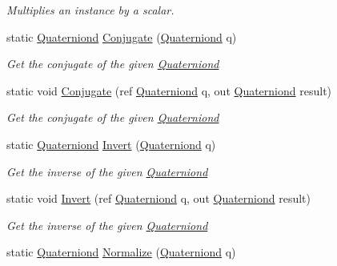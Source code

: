 \begin{DoxyCompactItemize}
\begin{DoxyCompactList}\small\item\em Multiplies an instance by a scalar. \end{DoxyCompactList}\item 
static \hyperlink{struct_open_t_k_1_1_quaterniond}{Quaterniond} \hyperlink{struct_open_t_k_1_1_quaterniond_a6e31ad4548580e67fd112673b047563e}{Conjugate} (\hyperlink{struct_open_t_k_1_1_quaterniond}{Quaterniond} q)
\begin{DoxyCompactList}\small\item\em Get the conjugate of the given \hyperlink{struct_open_t_k_1_1_quaterniond}{Quaterniond} \end{DoxyCompactList}\item 
static void \hyperlink{struct_open_t_k_1_1_quaterniond_a1dec147f14cb1847374fb87e6718e193}{Conjugate} (ref \hyperlink{struct_open_t_k_1_1_quaterniond}{Quaterniond} q, out \hyperlink{struct_open_t_k_1_1_quaterniond}{Quaterniond} result)
\begin{DoxyCompactList}\small\item\em Get the conjugate of the given \hyperlink{struct_open_t_k_1_1_quaterniond}{Quaterniond} \end{DoxyCompactList}\item 
static \hyperlink{struct_open_t_k_1_1_quaterniond}{Quaterniond} \hyperlink{struct_open_t_k_1_1_quaterniond_a2e0b1d66188a58a10dd71676b51d2743}{Invert} (\hyperlink{struct_open_t_k_1_1_quaterniond}{Quaterniond} q)
\begin{DoxyCompactList}\small\item\em Get the inverse of the given \hyperlink{struct_open_t_k_1_1_quaterniond}{Quaterniond} \end{DoxyCompactList}\item 
static void \hyperlink{struct_open_t_k_1_1_quaterniond_a9b96050970ec65cd8120565bdcf956f9}{Invert} (ref \hyperlink{struct_open_t_k_1_1_quaterniond}{Quaterniond} q, out \hyperlink{struct_open_t_k_1_1_quaterniond}{Quaterniond} result)
\begin{DoxyCompactList}\small\item\em Get the inverse of the given \hyperlink{struct_open_t_k_1_1_quaterniond}{Quaterniond} \end{DoxyCompactList}\item 
static \hyperlink{struct_open_t_k_1_1_quaterniond}{Quaterniond} \hyperlink{struct_open_t_k_1_1_quaterniond_aba1ff89904f1e08232eaa5b24c77e231}{Normalize} (\hyperlink{struct_open_t_k_1_1_quaterniond}{Quaterniond} q)

\end{DoxyCompactItemize}

